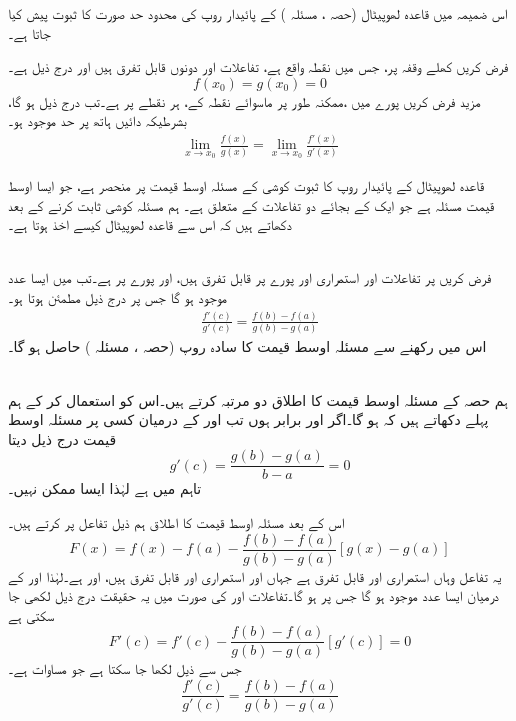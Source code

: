 
اس ضمیمہ میں قاعدہ    لھوپیٹال (حصہ ، مسئلہ ) کے پائیدار  روپ کی محدود حد صورت کا ثبوت پیش کیا جاتا ہے۔

فرض کریں     کھلے وقفہ  پر، جس میں نقطہ    واقع  ہے، تفاعلات  اور   دونوں قابل تفرق ہیں اور درج ذیل ہے۔
\[f(x_0)=g(x_0)=0\]
مزید فرض کریں   پورے  میں  ،ممکنہ طور پر   ماسوائے  نقطہ  کے، ہر نقطے پر   ہے۔تب درج  ذیل ہو گا، بشرطیکہ  دائیں ہاتھ  پر حد موجود ہو۔
\begin{align}\label{مساوات_ضمیمہ_پائیدار_روپ}
\lim_{x\to x_0}\frac{f(x)}{g(x)}=\lim_{x\to x_0}\frac{f'(x)}{g'(x)}
\end{align}

قاعدہ    لھوپیٹال کے پائیدار روپ کا ثبوت کوشی کے مسئلہ اوسط قیمت  پر منحصر ہے، جو ایسا اوسط قیمت مسئلہ ہے جو  ایک کے بجائے دو تفاعلات کے متعلق ہے۔ ہم   مسئلہ کوشی   ثابت کرنے کے بعد دکھاتے ہیں   کہ اس سے قاعدہ    لھوپیٹال  کیسے اخذ ہوتا ہے۔

\\
فرض کریں  پر تفاعلات  اور  استمراری اور پورے   پر  قابل تفرق ہیں، اور پورے  پر  ہے۔تب  میں  ایسا عدد  موجود ہو گا جس پر درج ذیل مطمئن ہوتا ہو۔
\begin{align}\label{مساوات_ضمیمہ_کوشی_مسئلہ}
\frac{f'(c)}{g'(c)}=\frac{f(b)-f(a)}{g(b)-g(a)}
\end{align}
  اس میں   رکھنے سے  مسئلہ اوسط قیمت  کا سادہ روپ (حصہ ، مسئلہ ) حاصل ہو گا۔

\\
ہم حصہ  کے مسئلہ اوسط قیمت کا اطلاق دو مرتبہ کرتے ہیں۔اس کو استعمال کر کے ہم پہلے دکھاتے ہیں کہ  ہو گا۔اگر   اور  برابر ہوں تب  اور  کے درمیان کسی  پر  مسئلہ اوسط قیمت درج ذیل دیتا
\[g'(c)=\frac{g(b)-g(a)}{b-a}=0\]
تاہم  میں  ہے لہٰذا ایسا ممکن نہیں۔

اس کے بعد مسئلہ اوسط قیمت کا اطلاق  ہم ذیل تفاعل پر  کرتے ہیں۔
\[F(x)=f(x)-f(a)-\frac{f(b)-f(a)}{g(b)-g(a)}[g(x)-g(a)]\]
یہ تفاعل وہاں استمراری اور قابل تفرق ہے جہاں  اور  استمراری اور قابل تفرق ہیں، اور  ہے۔لہٰذا  اور  کے درمیان  ایسا   عدد  موجود ہو گا جس پر  ہو گا۔تفاعلات  اور  کی صورت میں یہ حقیقت درج ذیل لکھی جا سکتی ہے
\[F'(c)=f'(c)-\frac{f(b)-f(a)}{g(b)-g(a)}[g'(c)]=0\]
جس سے ذیل لکھا جا سکتا ہے جو مساوات  ہے۔
\[\frac{f'(c)}{g'(c)}=\frac{f(b)-f(a)}{g(b)-g(a)}\]

